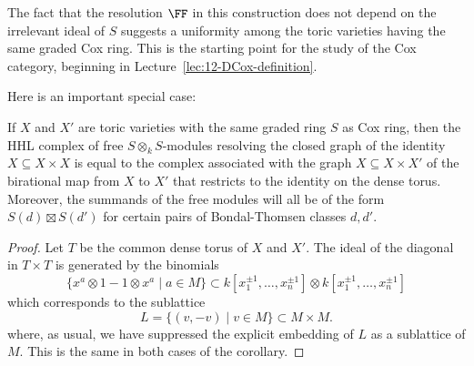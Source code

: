 \documentclass{amsart}
\begin{document}
The fact that the resolution $\FF$ in this construction does not depend on the irrelevant ideal of $S$
suggests a uniformity among the toric varieties having the same graded Cox ring. This
is the starting point for the study of the Cox category, beginning in Lecture~\ref{lec:12-DCox-definition}.

Here is an important special case: 

\begin{cor}\label{cor:diagonalUniform}
If $X$ and $X'$ are toric varieties with the same graded ring $S$ as Cox ring, then the HHL complex of free $S\otimes_k S$-modules resolving the closed graph of the identity $X\subseteq X\times X$ is equal to the complex associated with the 
graph $X\subseteq X\times X'$ of the birational map from $X$ to $X'$ that restricts to the identity on the dense torus.
Moreover, the summands of the free modules will all be of the form $S(d)\boxtimes S(d')$ for certain pairs of Bondal-Thomsen classes $d,d'$. 
 \end{cor}
\begin{proof}
Let $T$ be the common dense torus of $X$ and $X'$. The ideal of the diagonal in $T\times T$ is
generated by the binomials 
$$
\{x^{a}\otimes 1-1\otimes x^{a}  \mid a\in M\} \subset k[x_{1}^{\pm 1}, \dots, x_{n}^{\pm 1}]
\otimes k[x_{1}^{\pm 1}, \dots, x_{n}^{\pm 1}]
$$
which corresponds to the sublattice 
$$
L = \{(v,-v)\mid v\in M\}\subset M\times M.
$$
where, as usual, we have suppressed the explicit embedding of $L$ as a sublattice of $M$. This is
the same in both cases of the corollary.
\end{proof}
\end{document}
